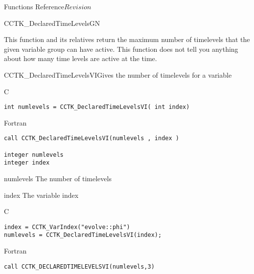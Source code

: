 \begin{cactuspart}{ Functions Reference}{}{$Revision$}
\begin{FunctionDescription}{CCTK\_DeclaredTimeLevelsGN}
\begin{Discussion}
This function and its relatives return the maximum number of timelevels that the given variable group can have active.  This function does not tell you anything about how many time levels are active at the time.
\end{Discussion}
\end{FunctionDescription}



\begin{FunctionDescription}{CCTK\_DeclaredTimeLevelsVI}{Gives the number of timelevels for a variable}
\label{CCTK-DeclaredTimeLevelsVI}
\begin{SynopsisSection}
\begin{Synopsis}{C}
\begin{verbatim}int numlevels = CCTK_DeclaredTimeLevelsVI( int index)\end{verbatim}
\end{Synopsis}
\begin{Synopsis}{Fortran}
\begin{verbatim}call CCTK_DeclaredTimeLevelsVI(numlevels , index )

integer numlevels
integer index\end{verbatim}
\end{Synopsis}
\end{SynopsisSection}
\begin{ParameterSection}
\begin{Parameter}{numlevels}
The number of timelevels
\end{Parameter}
\begin{Parameter}{index}
The variable index
\end{Parameter}
\end{ParameterSection}

\begin{ExampleSection}
\begin{Example}{C}
\begin{verbatim}
index = CCTK_VarIndex("evolve::phi")
numlevels = CCTK_DeclaredTimeLevelsVI(index);
\end{verbatim}
\end{Example}
\begin{Example}{Fortran}
\begin{verbatim}
call CCTK_DECLAREDTIMELEVELSVI(numlevels,3)
\end{verbatim}
\end{Example}
\end{ExampleSection}
\end{FunctionDescription}


\end{cactuspart}
